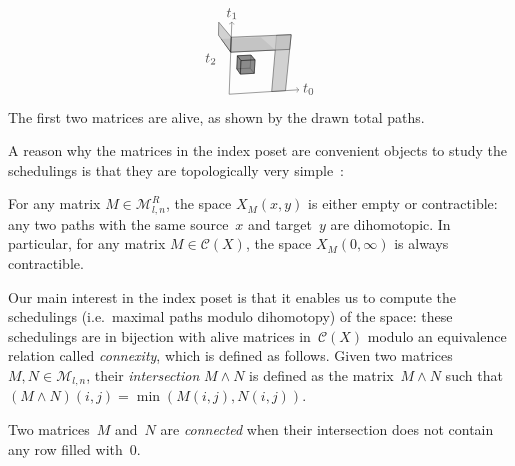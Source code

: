 \documentclass[orivec]{llncs} \usepackage[T1]{fontenc}
\newcommand{\C}{\mathcal{C}}
\newcommand{\ie}{i.e.~}
\newcommand{\Mat}{\mathcal{M}}
\renewcommand{\C}{\mathcal{C}}
\begin{document}
{\begin{example}
\[\begin{tikzpicture}[line join=round,opacity=0.7]
\filldraw[fill=lightgray,draw=none](.585,.598)--(.825,.267)--(1.944,.319)--(1.583,.639)--cycle;
\draw(.585,.598)--(.825,.267)--(1.944,.319);
\filldraw[fill=lightgray](.825,.267)--(.839,.641)--(.524,1.017)--(.517,.692)--cycle;
\filldraw[fill=gray](1.068,-.283)--(1.416,-.263)--(1.314,-.133)--(.978,-.151)--cycle;
\filldraw[fill=gray](1.416,-.263)--(1.437,.072)--(1.333,.192)--(1.314,-.133)--cycle;
\filldraw[fill=gray](.978,-.151)--(1.314,-.133)--(1.333,.192)--(.993,.175)--cycle;
\filldraw[fill=gray](1.068,-.283)--(1.084,.055)--(.993,.175)--(.978,-.151)--cycle;
\filldraw[fill=gray](1.084,.055)--(1.437,.072)--(1.333,.192)--(.993,.175)--cycle;
\filldraw[fill=gray](1.068,-.283)--(1.416,-.263)--(1.437,.072)--(1.084,.055)--cycle;
\draw[arrows=->](.786,-.786)--(2.547,-.674);
\filldraw[fill=lightgray](1.855,-.718)--(2.203,-.696)--(2.345,.703)--(1.976,.687)--cycle;
\draw[arrows=-](.786,-.786)--(.825,.267);
\filldraw[fill=lightgray](.825,.267)--(2.308,.336)--(2.345,.703)--(.839,.641)--cycle;
\draw[arrows=-](.825,.267)--(.839,.641);
\draw[arrows=->](.839,.641)--(.853,1.028);
\draw (2.786,-.659) node {$t_0$};\draw (.86,1.226) node {$t_1$};\draw (.326,.094) node {$t_2$};\end{tikzpicture}   \]
  The first two matrices are alive, as shown by the drawn total paths.
\end{example}
}

A reason why the matrices in the index poset are convenient objects to study the
schedulings is that they are topologically very
simple~\cite{raussen2010simplicial}:
\begin{proposition}
  \label{prop:alive-dihom}
  For any matrix $M\in\Mat_{l,n}^R$, the space $X_M(x,y)$ is either empty or
  contractible: any two paths with the same source~$x$ and target~$y$ are
  dihomotopic. In particular, for any matrix $M\in\C(X)$, the space
  $X_M(0,\infty)$ is always contractible.
\end{proposition}

Our main interest in the index poset is that it enables us to compute the
schedulings (\ie maximal paths modulo dihomotopy) of the space: these
schedulings are in bijection with alive matrices in~$\C(X)$ modulo an
equivalence relation called \emph{connexity}, which is defined as follows. Given
two matrices~$M,N\in\Mat_{l,n}$, their \emph{intersection} $M\wedge N$ is
defined as the matrix~$M\wedge N$ such that $(M\wedge
N)(i,j)=\min(M(i,j),N(i,j))$.

\begin{definition}
  \label{def:connected}
  Two matrices~$M$ and~$N$ are \emph{connected} when their intersection does not
  contain any row filled with~$0$.
\end{definition}
\end{document}

